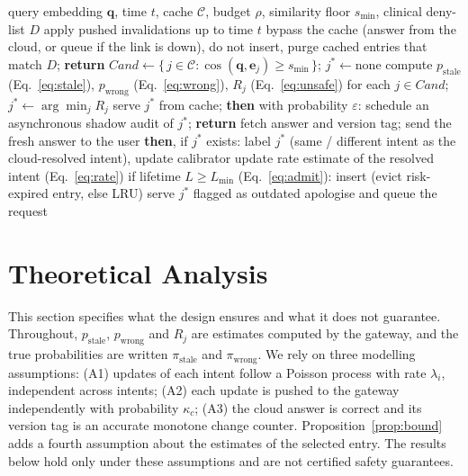 \documentclass[journal]{IEEEtran}
\begin{document}
\begin{algorithm}[!t]
\caption{RAASC query handling}\label{alg:raasc}
\begin{algorithmic}[1]
\Require query embedding $\mathbf{q}$, time $t$, cache $\mathcal{C}$, budget $\rho$, similarity floor $s_{\min}$, clinical deny-list $D$
\State apply pushed invalidations up to time $t$
\State bypass the cache (answer from the cloud, or queue if the link is down), do not insert, purge cached entries that match $D$; \textbf{return}
\EndIf
\State $\mathit{Cand}\leftarrow\{\,j\in\mathcal{C}:\cos(\mathbf{q},\mathbf{e}_j)\ge s_{\min}\,\}$; $j^{*}\leftarrow\text{none}$
\State compute $p_{\text{stale}}$ (Eq.~\ref{eq:stale}), $p_{\text{wrong}}$ (Eq.~\ref{eq:wrong}), $R_j$ (Eq.~\ref{eq:unsafe}) for each $j\in\mathit{Cand}$; $j^{*}\leftarrow\arg\min_j R_j$
\EndIf
{}
\State serve $j^{*}$ from cache; \textbf{then}
\State with probability $\varepsilon$: schedule an asynchronous shadow audit of $j^{*}$; \textbf{return}
\EndIf
{}
\State fetch answer and version tag; send the fresh answer to the user
\State \textbf{then}, if $j^{*}$ exists: label $j^{*}$ (same / different intent as the cloud-resolved intent), update calibrator
\State update rate estimate of the resolved intent (Eq.~\ref{eq:rate})
\State if lifetime $L\ge L_{\min}$ (Eq.~\ref{eq:admit}): insert (evict risk-expired entry, else LRU)
\State serve $j^{*}$ flagged as outdated
\Else
\State apologise and queue the request
\EndIf
\end{algorithmic}
\end{algorithm}

\section{Theoretical Analysis}\label{sec:theory}
This section specifies what the design ensures and what it does not guarantee. Throughout, $p_{\text{stale}}$, $p_{\text{wrong}}$ and $R_j$ are estimates computed by the gateway, and the true probabilities are written $\pi_{\text{stale}}$ and $\pi_{\text{wrong}}$. We rely on three modelling assumptions: (A1) updates of each intent follow a Poisson process with rate $\lambda_i$, independent across intents; (A2) each update is pushed to the gateway independently with probability $\kappa_c$; (A3) the cloud answer is correct and its version tag is an accurate monotone change counter. Proposition~\ref{prop:bound} adds a fourth assumption about the estimates of the selected entry. The results below hold only under these assumptions and are not certified safety guarantees.
\end{document}
